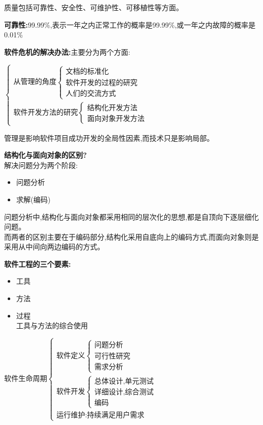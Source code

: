 \documentclass[UTF8,a4paper]{ctexart}
\newcommand{\spaceline}{\vspace{\baselineskip}}
\begin{document}
  \spaceline
  质量包括可靠性、安全性、可维护性、可移植性等方面。

  \spaceline
  \textbf{可靠性:}99.99\%,表示一年之内正常工作的概率是99.99\%,或一年之内故障的概率是0.01\%

  \spaceline
  \textbf{软件危机的解决办法:}主要分为两个方面:

  $\left \{\begin{array}{l}
    \text{从管理的角度}\left \{\begin{array}{l}
    \text{文档的标准化}\\
    \text{软件开发的过程的研究}\\
    \text{人们的交流方式}
    \end{array}\right .
    \\
    \text{软件开发方法的研究} \left \{ \begin{array}{l}
    \text{结构化开发方法}\\
    \text{面向对象开发方法}
    \end{array} \right .
  \end{array}\right .$

  管理是影响软件项目成功开发的全局性因素,而技术只是影响局部。\spaceline

  \textbf{结构化与面向对象的区别?}\\
  解决问题分为两个阶段:
  \begin{itemize}
    \item 问题分析
    \item 求解(编码)
  \end{itemize}

  问题分析中,结构化与面向对象都采用相同的层次化的思想,都是自顶向下逐层细化问题。\\
  而两者的区别主要在于编码部分,结构化采用自底向上的编码方式,而面向对象则是采用从中间向两边编码的方式。

  \spaceline
  \textbf{软件工程的三个要素:}
  \begin{itemize}
    \item 工具
    \item 方法
    \item 过程\\
    工具与方法的综合使用
  \end{itemize}

  \spaceline
  $\text{软件生命周期}\left \{\begin{array}{l}
  \text{软件定义} \left \{\begin{array}{l}
    \text{问题分析}\\
    \text{可行性研究}\\
    \text{需求分析}
  \end{array} \right .\\
  \text{软件开发} \left \{\begin{array}{l}
    \text{总体设计,单元测试}\\
    \text{详细设计,综合测试}\\
    \text{编码}
  \end{array} \right .\\
  \text{运行维护:持续满足用户需求}
  \end{array} \right .$
\end{document}
